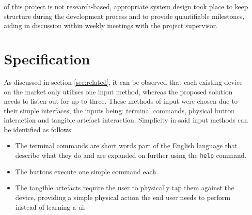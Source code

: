 %
%

 of this project is not research-based, appropriate system design took place to keep structure during the development process and to provide quantifiable milestones, aiding in discussion within weekly meetings with the project supervisor.

\section{Specification}\label{sec:spec}
As discussed in section \ref{sec:related}, it can be observed that each existing device on the market only utilises one input method, whereas the proposed solution needs to listen out for up to three. These methods of input were chosen due to their simple interfaces, the inputs being: terminal commands, physical button interaction and tangible artefact interaction. Simplicity in said input methods can be identified as follows:
\begin{itemize}
    \item The terminal commands are short words part of the English language that describe what they do and are expanded on further using the \texttt{help} command.
    \item The buttons execute one simple command each.
    \item The tangible artefacts require the user to physically tap them against the device, providing a simple physical action the end user needs to perform instead of learning a \gls{ui}.
\end{itemize} 


